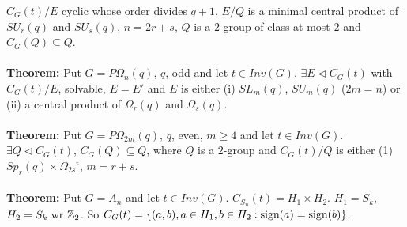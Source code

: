 $C_G(t)/E$ cyclic whose order divides $q+1$, $E/Q$ is a minimal central product of $SU_r(q)$ and $SU_s(q)$, $n =2r+s$, $Q$ is a $2$-group
of class at most $2$ and $C_G(Q) \subseteq Q$.
\\
\\
{\bf Theorem:} Put $G = P\Omega_{n}(q)$, $q$, odd and let $t \in Inv(G)$.  $\exists E \lhd C_G(t)$ with $C_G(t)/E$, solvable,
$E=E'$ and $E$ is either (i) $SL_m(q)$, $SU_m(q)$ ($2m=n$) or (ii) a central product of $\Omega_r(q)$ and $\Omega_s(q)$.
\\
\\
{\bf Theorem:} Put $G = P\Omega_{2m}(q)$, $q$, even, $m \geq 4$ and let $t \in Inv(G)$. $\exists Q \lhd C_G(t)$, $C_G(Q) \subseteq Q$,
where $Q$ is a $2$-group and $C_G(t)/Q$ is either (1) $Sp_r(q) \times {\Omega_{2s}}^{\epsilon}$, $m=r+s$.
\\
\\
{\bf Theorem:} Put $G = A_n$ and let $t \in Inv(G)$. $C_{S_n}(t) = H_1 \times H_2$.  $H_1= S_k$, $H_2= S_k \textnormal{ wr } \mathbb{Z}_2$.
So $C_G(t) = \{ (a, b), a \in H_1, b \in H_2: \textnormal{sign}(a) =  \textnormal{sign}(b) \}$.
